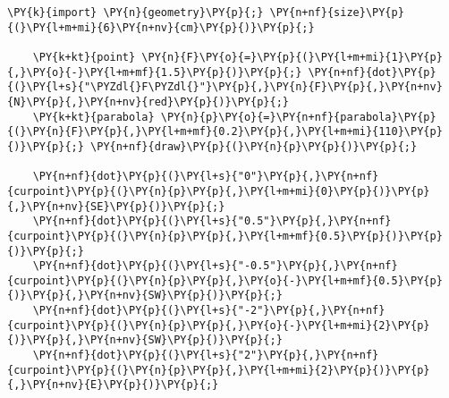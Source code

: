 \begin{Verbatim}[commandchars=\\\{\}]
    \PY{k}{import} \PY{n}{geometry}\PY{p}{;} \PY{n+nf}{size}\PY{p}{(}\PY{l+m+mi}{6}\PY{n+nv}{cm}\PY{p}{)}\PY{p}{;}

    \PY{k+kt}{point} \PY{n}{F}\PY{o}{=}\PY{p}{(}\PY{l+m+mi}{1}\PY{p}{,}\PY{o}{-}\PY{l+m+mf}{1.5}\PY{p}{)}\PY{p}{;} \PY{n+nf}{dot}\PY{p}{(}\PY{l+s}{"\PYZdl{}F\PYZdl{}"}\PY{p}{,}\PY{n}{F}\PY{p}{,}\PY{n+nv}{N}\PY{p}{,}\PY{n+nv}{red}\PY{p}{)}\PY{p}{;}
    \PY{k+kt}{parabola} \PY{n}{p}\PY{o}{=}\PY{n+nf}{parabola}\PY{p}{(}\PY{n}{F}\PY{p}{,}\PY{l+m+mf}{0.2}\PY{p}{,}\PY{l+m+mi}{110}\PY{p}{)}\PY{p}{;} \PY{n+nf}{draw}\PY{p}{(}\PY{n}{p}\PY{p}{)}\PY{p}{;}

    \PY{n+nf}{dot}\PY{p}{(}\PY{l+s}{"0"}\PY{p}{,}\PY{n+nf}{curpoint}\PY{p}{(}\PY{n}{p}\PY{p}{,}\PY{l+m+mi}{0}\PY{p}{)}\PY{p}{,}\PY{n+nv}{SE}\PY{p}{)}\PY{p}{;}
    \PY{n+nf}{dot}\PY{p}{(}\PY{l+s}{"0.5"}\PY{p}{,}\PY{n+nf}{curpoint}\PY{p}{(}\PY{n}{p}\PY{p}{,}\PY{l+m+mf}{0.5}\PY{p}{)}\PY{p}{)}\PY{p}{;}
    \PY{n+nf}{dot}\PY{p}{(}\PY{l+s}{"-0.5"}\PY{p}{,}\PY{n+nf}{curpoint}\PY{p}{(}\PY{n}{p}\PY{p}{,}\PY{o}{-}\PY{l+m+mf}{0.5}\PY{p}{)}\PY{p}{,}\PY{n+nv}{SW}\PY{p}{)}\PY{p}{;}
    \PY{n+nf}{dot}\PY{p}{(}\PY{l+s}{"-2"}\PY{p}{,}\PY{n+nf}{curpoint}\PY{p}{(}\PY{n}{p}\PY{p}{,}\PY{o}{-}\PY{l+m+mi}{2}\PY{p}{)}\PY{p}{,}\PY{n+nv}{SW}\PY{p}{)}\PY{p}{;}
    \PY{n+nf}{dot}\PY{p}{(}\PY{l+s}{"2"}\PY{p}{,}\PY{n+nf}{curpoint}\PY{p}{(}\PY{n}{p}\PY{p}{,}\PY{l+m+mi}{2}\PY{p}{)}\PY{p}{,}\PY{n+nv}{E}\PY{p}{)}\PY{p}{;}
\end{Verbatim}
